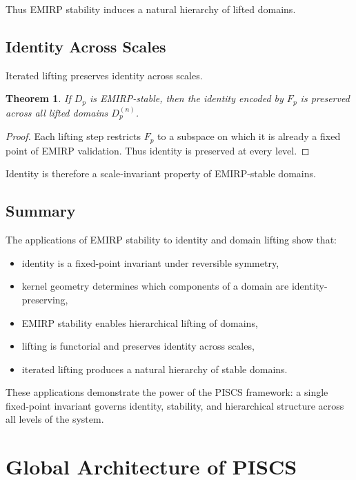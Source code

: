 \documentclass[11pt]{article}
\theoremstyle{definition}
\theoremstyle{plain}
\newtheorem{theorem}[definition]{Theorem}
\theoremstyle{remark}
\begin{document}
Thus EMIRP stability induces a natural hierarchy of lifted domains.

\subsection{Identity Across Scales}

Iterated lifting preserves identity across scales.

\begin{theorem}
If $D_p$ is EMIRP-stable, then the identity encoded by $F_p$ is
preserved across all lifted domains $D_p^{(n)}$.
\end{theorem}

\begin{proof}
Each lifting step restricts $F_p$ to a subspace on which it is already
a fixed point of EMIRP validation. Thus identity is preserved at every
level.
\end{proof}

Identity is therefore a scale-invariant property of EMIRP-stable
domains.

\subsection{Summary}

The applications of EMIRP stability to identity and domain lifting show
that:

\begin{itemize}
    \item identity is a fixed-point invariant under reversible symmetry,
    \item kernel geometry determines which components of a domain are
    identity-preserving,
    \item EMIRP stability enables hierarchical lifting of domains,
    \item lifting is functorial and preserves identity across scales,
    \item iterated lifting produces a natural hierarchy of stable domains.
\end{itemize}

These applications demonstrate the power of the PISCS framework: a
single fixed-point invariant governs identity, stability, and
hierarchical structure across all levels of the system.

\section{Global Architecture of PISCS}
\end{document}
